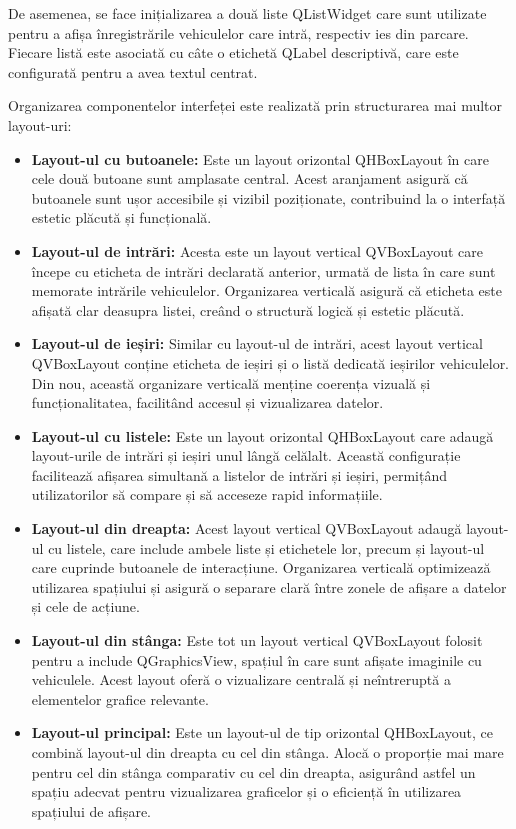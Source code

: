 \documentclass[a4paper,12pt]{report}
\begin{document}
De asemenea, se face inițializarea a două liste QListWidget care sunt utilizate pentru a afișa înregistrările vehiculelor care intră, respectiv ies din parcare. Fiecare listă este asociată cu câte o etichetă QLabel descriptivă, care este configurată pentru a avea textul centrat.

Organizarea componentelor interfeței este realizată prin structurarea mai multor layout-uri:
\begin{itemize}
    \item \textbf{Layout-ul cu butoanele:} Este un layout orizontal QHBoxLayout în care cele două butoane sunt amplasate central. Acest aranjament asigură că butoanele sunt ușor accesibile și vizibil poziționate, contribuind la o interfață estetic plăcută și funcțională.

    \item \textbf{Layout-ul de intrări:} Acesta este un layout vertical QVBoxLayout care începe cu eticheta de intrări declarată anterior, urmată de lista în care sunt memorate intrările vehiculelor. Organizarea verticală asigură că eticheta este afișată clar deasupra listei, creând o structură logică și estetic plăcută.

    \item \textbf{Layout-ul de ieșiri:} Similar cu layout-ul de intrări, acest layout vertical QVBoxLayout conține eticheta de ieșiri și o listă dedicată ieșirilor vehiculelor. Din nou, această organizare verticală menține coerența vizuală și funcționalitatea, facilitând accesul și vizualizarea datelor.

    \item \textbf{Layout-ul cu listele:} Este un layout orizontal QHBoxLayout care adaugă layout-urile de intrări și ieșiri unul lângă celălalt. Această configurație facilitează afișarea simultană a listelor de intrări și ieșiri, permițând utilizatorilor să compare și să acceseze rapid informațiile.

    \item \textbf{Layout-ul din dreapta:} Acest layout vertical QVBoxLayout adaugă layout-ul cu listele, care include ambele liste și etichetele lor, precum și layout-ul care cuprinde butoanele de interacțiune. Organizarea verticală optimizează utilizarea spațiului și asigură o separare clară între zonele de afișare a datelor și cele de acțiune.

    \item \textbf{Layout-ul din stânga:} Este tot un layout vertical QVBoxLayout folosit pentru a include QGraphicsView, spațiul în care sunt afișate imaginile cu vehiculele. Acest layout oferă o vizualizare centrală și neîntreruptă a elementelor grafice relevante.

    \item \textbf{Layout-ul principal:} Este un layout-ul de tip orizontal QHBoxLayout, ce combină layout-ul din dreapta cu cel din stânga. Alocă o proporție mai mare pentru cel din stânga comparativ cu cel din dreapta, asigurând astfel un spațiu adecvat pentru vizualizarea graficelor și o eficiență în utilizarea spațiului de afișare.
\end{itemize}
\end{document}
